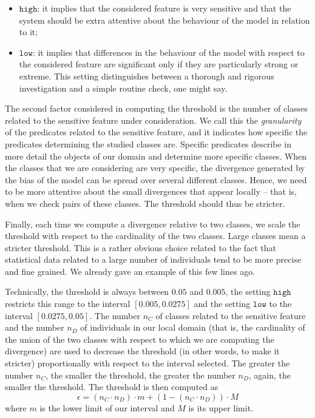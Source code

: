\documentclass[
]{ceurart}
\begin{document}
\begin{itemize}
\item $\mathtt{high}$: it implies that the considered feature is very sensitive and that the system should be extra attentive about the behaviour of the model in relation to it;
\item $\mathtt{low}$: it implies that differences in the behaviour of the model with respect to the considered feature are significant only if they are particularly strong or extreme. This setting distinguishes between a thorough and rigorous investigation and a simple routine check, one might say.
\end{itemize}



The second factor considered in computing the threshold is the number of classes related to the sensitive feature under consideration. We  call this the {\it granularity} of the predicates related to the sensitive feature, and it indicates how specific the predicates determining the studied classes are. Specific predicates describe in more detail the objects of our domain and determine more specific classes. When the classes that we are considering are very specific, the divergence generated by the bias of the model can be spread over several different classes. Hence, we need to be more attentive about the small divergences that appear locally -- that is, when we check pairs of these classes. The threshold should thus be stricter.


Finally, each time we compute a divergence relative to two classes, we scale the threshold with respect to the cardinality of the two classes. Large classes mean a stricter threshold. This is a rather obvious choice related to the fact that statistical data related to a large number of individuals tend to be more precise and fine grained. We already gave an example of this few lines ago.

Technically, the threshold is always between $0.05$ and $0.005$, the setting $\mathtt{high}$ restricts this range to the interval $[0.005,0.0275]$ and the setting $\mathtt{low}$ to the interval $[0.0275,0.05]$. The number $n_C$ of classes related to the sensitive feature and the number $n_D$ of individuals in our local domain (that is, the cardinality of the union of the two classes with respect to which we are computing the divergence) are used to decrease the threshold (in other words, to make it stricter) proportionally with respect to the interval selected. The greater the number $n_C$, the smaller the threshold, the greater the number $n_D$, again, the smaller the threshold. The threshold is then computed as
\[
\epsilon = (n_C \cdot n_D) \cdot m + (1-(n_C \cdot n_D)) \cdot M
\]
where $m$ is the lower limit of our interval and $M$ is its upper limit.
\end{document}
